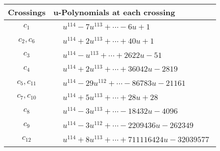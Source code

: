 \documentclass[1p]{elsarticle_modified}
\theoremstyle{definition}
\begin{document}
\begin{tabular}{m{50pt}|m{274pt}}
Crossings & \hspace{64pt}u-Polynomials at each crossing \\
\hline $$\begin{aligned}c_{1}\end{aligned}$$&$\begin{aligned}
&u^{114}-7 u^{113}+\cdots-6 u+1
\end{aligned}$\\
\hline $$\begin{aligned}c_{2},c_{6}\end{aligned}$$&$\begin{aligned}
&u^{114}+2 u^{113}+\cdots+40 u+1
\end{aligned}$\\
\hline $$\begin{aligned}c_{3}\end{aligned}$$&$\begin{aligned}
&u^{114}- u^{113}+\cdots+2622 u-51
\end{aligned}$\\
\hline $$\begin{aligned}c_{4}\end{aligned}$$&$\begin{aligned}
&u^{114}+2 u^{113}+\cdots+36042 u-2819
\end{aligned}$\\
\hline $$\begin{aligned}c_{5},c_{11}\end{aligned}$$&$\begin{aligned}
&u^{114}-29 u^{112}+\cdots-86783 u-21161
\end{aligned}$\\
\hline $$\begin{aligned}c_{7},c_{10}\end{aligned}$$&$\begin{aligned}
&u^{114}+5 u^{113}+\cdots+28 u+28
\end{aligned}$\\
\hline $$\begin{aligned}c_{8}\end{aligned}$$&$\begin{aligned}
&u^{114}-3 u^{113}+\cdots-18432 u-4096
\end{aligned}$\\
\hline $$\begin{aligned}c_{9}\end{aligned}$$&$\begin{aligned}
&u^{114}-3 u^{112}+\cdots-2209436 u-262349
\end{aligned}$\\
\hline $$\begin{aligned}c_{12}\end{aligned}$$&$\begin{aligned}
&u^{114}+8 u^{113}+\cdots+711116424 u-32039577
\end{aligned}$\\
\hline
\end{tabular}\\~\\
\end{document}
